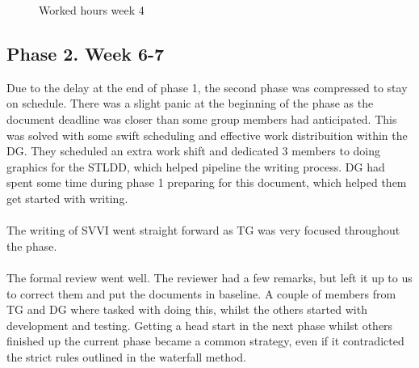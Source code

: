 \documentclass{article}
\begin{document}
\begin{figure}[!htb]
              \caption{Worked hours week 4}\label{fig:week5}
            \endminipage
        \end{figure}

    \subsection{Phase 2. Week 6-7 \label{phase2}}
        Due to the delay at the end of phase 1, the second phase was compressed to stay on schedule. 
        There was a slight panic at the beginning of the phase as the document deadline was closer than some group 
        members had anticipated. This was solved with some swift scheduling and effective work distribuition within 
        the DG. They scheduled an extra work shift and dedicated 3 members to doing graphics for 
        the STLDD, which helped pipeline the writing process. DG had spent some time during phase 1 preparing for 
        this document, which helped them get started with writing.
        \\ \\
        The writing of SVVI went straight forward as TG was very focused throughout the phase. 
        \\ \\
        The formal review went well. The reviewer had a few remarks, but left it up to us to correct them and put the 
        documents in baseline. A couple of members from TG and DG where tasked with doing this, whilst the others started 
        with development and testing. Getting a head start in the next phase whilst others finished up the current phase 
        became a common strategy, even if it contradicted the strict rules outlined in the waterfall method. 
        
\end{document}
